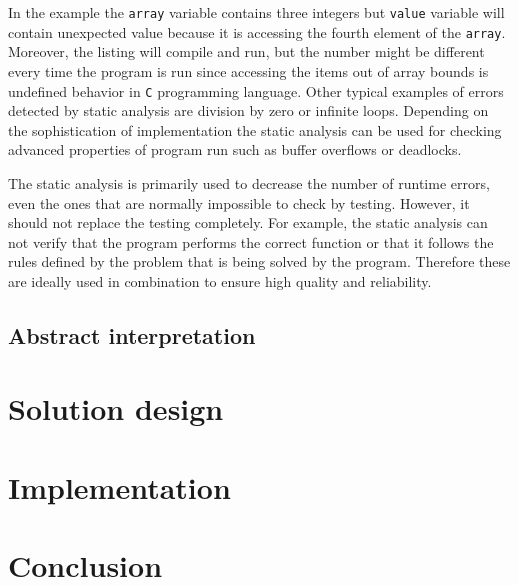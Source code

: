 \documentclass[12pt,final,oneside]{fithesis2}
\begin{document}
In the example the \texttt{array} variable contains three integers but
\texttt{value} variable will contain unexpected value because it is
accessing the fourth element of the \texttt{array}. Moreover, the
listing will compile and run, but the number might be different every
time the program is run since accessing the items out of array bounds is
undefined behavior in \texttt{C} programming language. Other typical
examples of errors detected by static analysis are division by zero or
infinite loops. Depending on the sophistication of implementation the
static analysis can be used for checking advanced properties of
program run such as buffer overflows or deadlocks.

The static analysis is primarily used to decrease the number of runtime
errors, even the ones that are normally impossible to check by testing.
However, it should not replace the testing completely. For example,
the static analysis can not verify that the program performs the correct
function or that it follows the rules defined by the problem that is
being solved by the program. Therefore these are ideally used in
combination to ensure high quality and reliability.


\section{Abstract interpretation}


\chapter{Solution design}
\label{chap:design}


\chapter{Implementation}
\label{chap:implementation}


\chapter{Conclusion}
\label{chap:conclusion}


\end{document}
